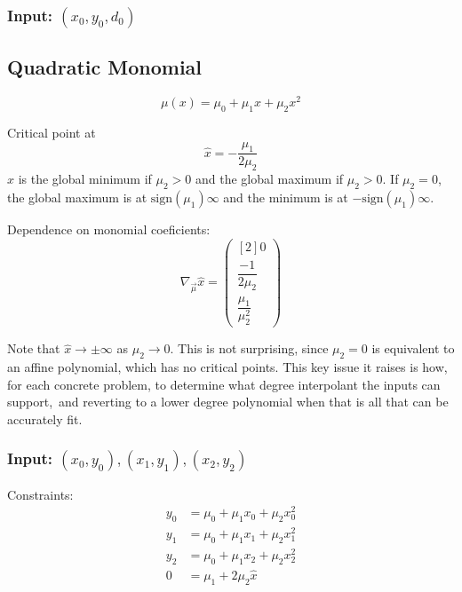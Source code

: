 

\subsubsection{Input: $(x_0,y_0,d_0)$}



\subsection{Quadratic Monomial}

\begin{equation}
\mu(x) = \mu_0 + \mu_1 x + \mu_2 x^2
\end{equation}

Critical point at
\begin{equation}
\hat{x} = - \frac{\mu_1}{2 \mu_2}
\end{equation}
$\hat{x}$ is the global minimum if $\mu_2>0$ 
and the global maximum if $\mu_2>0$.
If $\mu_2 = 0$, the global maximum is at 
$\text{sign}(\mu_1)\infty$
and the minimum is at $-\text{sign}(\mu_1)\infty$.

Dependence on monomial coeficients:
\begin{equation}
\nabla_{\vec{\mu}} \hat{x} =
\begin{pmatrix}[2]
0 
\\
\dfrac{-1}{2 \mu_2} 
\\
\dfrac{\mu_1}{\mu_2^2}
\end{pmatrix}
\end{equation}

Note that $\hat{x} \to  \pm \infty$ as $\mu_2 \to 0$. 
This is not surprising, since $\mu_2 = 0$ is equivalent to
an affine polynomial, which has no critical points.
This key issue it raises is how, for each concrete problem,
to determine what degree interpolant the inputs can support,\
and reverting to a lower degree polynomial when that is all that
can be accurately fit.

\subsubsection{Input: $(x_0,y_0), (x_1,y_1), (x_2,y_2)$}
\label{sec:monomial-yyy}

%

Constraints:
\begin{align}
y_0 & = \mu_0+\mu_1 x_0+\mu_2 x_0^{2}  
\\
y_1 & = \mu_0+\mu_1 x_1+\mu_2 x_1^{2}  
\nonumber 
\\
y_2 & = \mu_0+\mu_1 x_2+\mu_2 x_2^{2}  
\nonumber 
\\
0 & = \mu_1 + 2 \mu_2 \hat{x}  
\nonumber 
\end{align}

